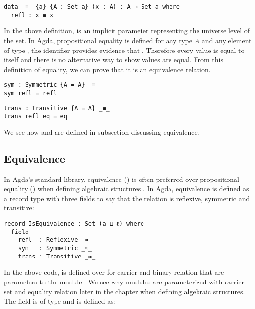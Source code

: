 \begin{verbatim}
data _≡_ {a} {A : Set a} (x : A) : A → Set a where
  refl : x ≡ x
\end{verbatim}

In the above definition,  is an implicit parameter representing the
universe level of the set. In Agda, propositional equality  is
defined for any type $A$ and any element  of type , the
identifier  provides evidence that . Therefore every
value is equal to itself and there is no alternative way to show values are
equal. From this definition of equality, we can prove that it is an equivalence
relation.

\begin{verbatim}
sym : Symmetric {A = A} _≡_
sym refl = refl
\end{verbatim}

\begin{verbatim}
trans : Transitive {A = A} _≡_
trans refl eq = eq
\end{verbatim}

We see how  and  are defined in subsection
discussing equivalence.

\subsection{Equivalence}
In Agda's standard library, equivalence () is often preferred over
propositional equality () when defining algebraic structures
\cite{musa}. In Agda, equivalence is defined as a record type with three fields
to say that the relation is reflexive, symmetric and transitive:

\begin{verbatim}
record IsEquivalence : Set (a ⊔ ℓ) where
  field
    refl  : Reflexive _≈_
    sym   : Symmetric _≈_
    trans : Transitive _≈_
\end{verbatim}

In the above code,  is defined over for carrier  and binary relation  that are parameters to the
module . We see why modules are parameterized with carrier
set and equality relation later in the chapter when defining algebraic
structures. The field  is of type  and is
defined as:

